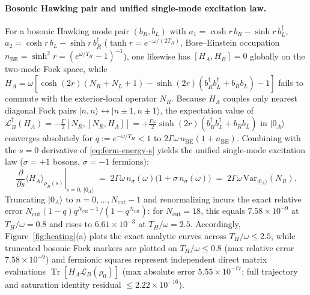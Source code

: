 \documentclass[11pt,a4paper]{article}
\theoremstyle{definition}
\theoremstyle{remark}
\newcommand{\Tr}{\operatorname{Tr}}
\newcommand{\cL}{\mathcal{L}}
\newcommand{\1}{\mathbf{1}}
\begin{document}
\paragraph{Bosonic Hawking pair and unified single-mode excitation law.}
For a bosonic Hawking mode pair $(b_R, b_L)$ with $a_1 = \cosh r\,b_R - \sinh r\,b_L^\dagger$, $a_2 = \cosh r\,b_L - \sinh r\,b_R^\dagger$ ($\tanh r = e^{-\omega/(2T_H)}$, Bose--Einstein occupation $n_{\mathrm{BE}} = \sinh^2 r = (e^{\omega/T_H}-1)^{-1}$), one likewise has $[H_A, H_B] = 0$ globally on the two-mode Fock space, while $H_A = \omega[\cosh(2r)(N_R+N_L+1) - \sinh(2r)(b_R^\dagger b_L^\dagger + b_R b_L) - 1]$ fails to commute with the exterior-local operator $N_R$. Because $H_A$ couples only nearest diagonal Fock pairs $|n,n\rangle \leftrightarrow |n\pm 1, n\pm 1\rangle$, the expectation value of $\cL_B^\dagger(H_A) = -\frac{\Gamma}{2}[N_R,[N_R,H_A]] = +\frac{\Gamma\omega}{2}\sinh(2r)(b_R^\dagger b_L^\dagger + b_R b_L)$ in $|0_A\rangle$ converges absolutely for $q := e^{-\omega/T_H} < 1$ to $2\Gamma\omega\,n_{\mathrm{BE}}(1+n_{\mathrm{BE}})$. Combining with the $s=0$ derivative of \eqref{eq:ferm-energy-s} yields the unified single-mode excitation law ($\sigma = +1$ bosons, $\sigma = -1$ fermions):
\begin{equation}\label{eq:unified-heating}
  \left.\frac{\partial}{\partial s}\langle H_A \rangle_{\rho_B(s)}\right|_{s=0,\,|0_A\rangle}
  \;=\; 2\Gamma\omega\, n_\sigma(\omega)\bigl(1 + \sigma\, n_\sigma(\omega)\bigr)
  \;=\; 2\Gamma\omega\,\mathrm{Var}_{|0_A\rangle}(N_R).
\end{equation}
Truncating $|0_A\rangle$ to $n = 0,\dots,N_{\mathrm{cut}}-1$ and renormalizing incurs the exact relative error $N_{\mathrm{cut}}(1-q)q^{N_{\mathrm{cut}}-1}/(1-q^{N_{\mathrm{cut}}})$: for $N_{\mathrm{cut}}=18$, this equals $7.58\times 10^{-9}$ at $T_H/\omega = 0.8$ and rises to $6.61\times 10^{-3}$ at $T_H/\omega = 2.5$. Accordingly, Figure~\ref{fig:heating}(a) plots the exact analytic curves across $T_H/\omega\le 2.5$, while truncated bosonic Fock markers are plotted on $T_H/\omega\le 0.8$ (max relative error $7.58\times 10^{-9}$) and fermionic squares represent independent direct matrix evaluations $\Tr[H_A\cL_B(\rho_0)]$ (max absolute error $5.55\times 10^{-17}$; full trajectory and saturation identity residual $\le 2.22\times 10^{-16}$).
\end{document}
